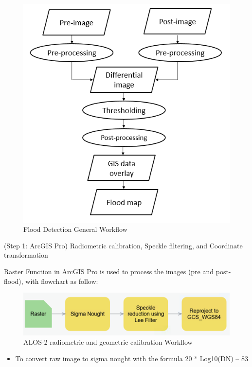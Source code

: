\documentclass[]{book}
\providecommand{\tightlist}{%
  \setlength{\itemsep}{0pt}\setlength{\parskip}{0pt}}
\theoremstyle{definition}
\theoremstyle{definition}
\theoremstyle{definition}
\theoremstyle{remark}
\begin{document}
\begin{figure}

{\centering \includegraphics[width=0.7\linewidth]{img/fig41_workflow} 

}

\caption{Flood Detection General Workflow}\label{fig:fig42a}
\end{figure}

(Step 1: ArcGIS Pro) Radiometric calibration, Speckle filtering, and
Coordinate transformation

Raster Function in ArcGIS Pro is used to process the images (pre and
post-flood), with flowchart as follow:

\begin{figure}

{\centering \includegraphics[width=0.7\linewidth]{img/fig41_workflow1} 

}

\caption{ALOS-2 radiometric and geometric calibration Workflow}\label{fig:fig42b}
\end{figure}

\begin{itemize}
\tightlist
\item
  To convert raw image to sigma nought with the formula 20 * Log10(DN)
  -- 83
\end{itemize}
\end{document}
